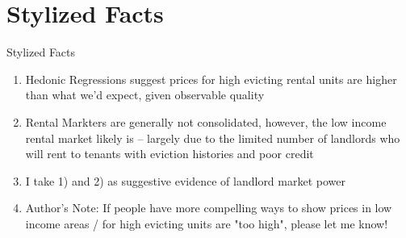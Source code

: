 \documentclass[10pt, xcolor=dvipsnames]{beamer}
\begin{document}
\section{Stylized Facts}

\begin{frame}{Stylized Facts}
    \begin{enumerate}
        \item Hedonic Regressions suggest prices for high evicting rental units are higher than what we'd expect, given observable quality
        \item Rental Markters are generally not consolidated, however, the low income rental market likely is -- largely due to the limited number of landlords who will rent to tenants with eviction histories and poor credit
        \item I take 1) and 2) as suggestive evidence of landlord market power
        \pause
        \item Author's Note: If people have more compelling ways to show prices in low income areas / for high evicting units are "too high", please let me know!
    \end{enumerate}
\end{frame}

    
\end{document}
